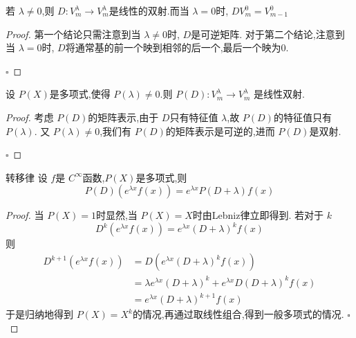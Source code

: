 \documentclass[lang=cn,12pt,color=green,fontset=none]{elegantbook}
\begin{document}
\begin{proposition}
    若 \(  \lambda\neq 0  \),则 \(  D: V_{m}^{\lambda}\to V_{m}^{\lambda}  \)是线性的双射.而当 \(  \lambda=0  \)时, \(  DV_{m}^{0}= V_{m-1}^{0}  \)  
\end{proposition}
\begin{proof}
    第一个结论只需注意到当 \(  \lambda \neq 0  \)时, \(  D  \)是可逆矩阵.
    对于第二个结论,注意到当 \(  \lambda=0  \)时, \(  D  \)将通常基的前一个映到相邻的后一个,最后一个映为0.    

    \hfill $\square$
\end{proof}

\begin{proposition}\label{pro:not-root-diff-ope}
    设 \(  P\left( X \right)   \)是多项式,使得 \(  P\left( \lambda \right) \neq 0   \).则 \(  P\left( D \right): V_{m}^{\lambda}   \to V_{m}^{\lambda}\)   是线性双射.
\end{proposition}
\begin{proof}
    考虑 \(  P\left( D \right)   \)的矩阵表示,由于 \(  D  \)只有特征值 \(  \lambda  \),故 \(  P\left( D \right)   \)的特征值只有 \(  P\left( \lambda \right)   \).
    又 \(  P\left( \lambda \right)\neq 0   \),我们有 \(  P\left( D \right)   \)的矩阵表示是可逆的,进而 \(  P\left( D \right)   \)是双射.         

    \hfill $\square$
\end{proof}

\begin{proposition}{转移律}
    设 \(  f  \)是 \(  C^{\infty}  \)函数,\(  P\left( X \right)   \)是多项式,则 \[
    P\left( D \right)\left( e^{\lambda x}f\left( x \right)  \right) = e^{\lambda x} P\left( D+ \lambda \right)f\left( x \right)    
    \]   
\end{proposition}
\begin{proof}
    当 \(  P\left( X \right)=1   \)时显然,当 \(  P\left( X \right)=X   \)时由Lebniz律立即得到.
    若对于 \(  k  \)  \[
    D^{k}\left( e^{\lambda x}f\left( x \right)  \right) = e^{\lambda x}\left( D+  \lambda \right)^{k}f\left( x \right)  
    \]则 \[
  \begin{aligned}
    D^{k+ 1}\left( e^{\lambda x} f\left( x \right)  \right) & = D \left( e^{\lambda x}\left( D+ \lambda  \right)^{k}f\left( x \right)   \right)\\ 
     & = \lambda e^{\lambda x} \left( D+ \lambda \right)^{k}+  e^{\lambda x} D\left( D+ \lambda \right)^{k}f\left( x \right)   \\ 
      & = e^{\lambda x} \left( D+ \lambda \right)^{k+ 1}f\left( x \right)  
  \end{aligned}  
    \]于是归纳地得到 \(  P\left( X \right)=X^{k}   \)的情况,再通过取线性组合,得到一般多项式的情况. 
    \hfill $\square$
\end{proof}
\end{document}
